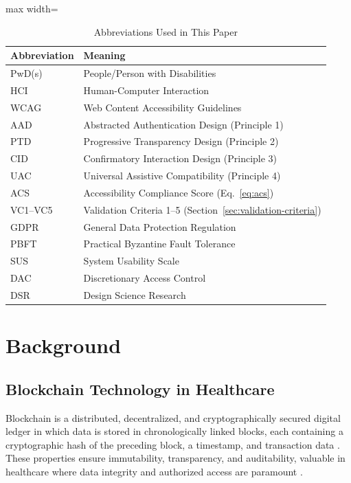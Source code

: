 \documentclass[journal,onecolumn]{IEEEtran}
\begin{document}
\begin{table}[htbp]
\caption{Abbreviations Used in This Paper}
\label{tab:abbreviations}
\begin{center}
\small
\begin{adjustbox}{max width=\columnwidth}
\begin{tabular}{|l|l|}
\hline
\textbf{Abbreviation} & \textbf{Meaning} \\
\hline
PwD(s) & People/Person with Disabilities \\
\hline
HCI & Human-Computer Interaction \\
\hline
WCAG & Web Content Accessibility Guidelines \\
\hline
AAD & Abstracted Authentication Design (Principle 1) \\
\hline
PTD & Progressive Transparency Design (Principle 2) \\
\hline
CID & Confirmatory Interaction Design (Principle 3) \\
\hline
UAC & Universal Assistive Compatibility (Principle 4) \\
\hline
ACS & Accessibility Compliance Score (Eq.~\ref{eq:acs}) \\
\hline
VC1--VC5 & Validation Criteria 1--5 (Section~\ref{sec:validation-criteria}) \\
\hline
GDPR & General Data Protection Regulation \\
\hline
PBFT & Practical Byzantine Fault Tolerance \\
\hline
SUS & System Usability Scale \\
\hline
DAC & Discretionary Access Control \\
\hline
DSR & Design Science Research \\
\hline
\end{tabular}
\end{adjustbox}
\end{center}
\end{table}

\section{Background}
\label{sec:background}

\subsection{Blockchain Technology in Healthcare}
Blockchain is a distributed, decentralized, and cryptographically secured digital ledger in which data is stored in chronologically linked blocks, each containing a cryptographic hash of the preceding block, a timestamp, and transaction data \cite{taherdoost2023role}. These properties ensure immutability, transparency, and auditability, valuable in healthcare where data integrity and authorized access are paramount \cite{ehsan2022integrating}.
\end{document}
